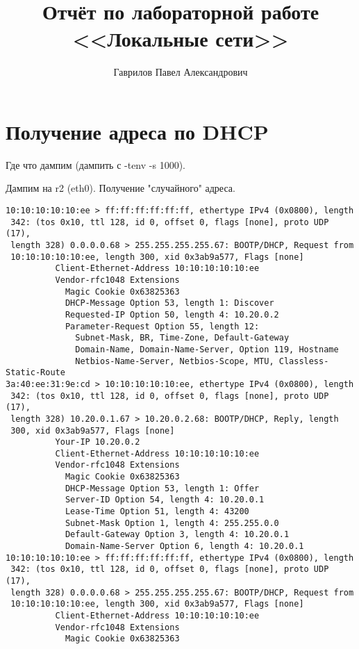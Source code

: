 \documentclass[a4paper,12pt]{article}
\title{Отчёт по лабораторной работе \\ <<Локальные сети>>}
\author{Гаврилов Павел Александрович}
\begin{document}
\maketitle

\tableofcontents

\section{Получение адреса по DHCP}

Где что дампим (дампить с -tenv -s 1000).

Дампим на r2 (eth0). Получение "случайного" адреса.

\begin{lstlisting}
10:10:10:10:10:ee > ff:ff:ff:ff:ff:ff, ethertype IPv4 (0x0800), length
 342: (tos 0x10, ttl 128, id 0, offset 0, flags [none], proto UDP (17),
 length 328) 0.0.0.0.68 > 255.255.255.255.67: BOOTP/DHCP, Request from
 10:10:10:10:10:ee, length 300, xid 0x3ab9a577, Flags [none]
          Client-Ethernet-Address 10:10:10:10:10:ee
          Vendor-rfc1048 Extensions
            Magic Cookie 0x63825363
            DHCP-Message Option 53, length 1: Discover
            Requested-IP Option 50, length 4: 10.20.0.2
            Parameter-Request Option 55, length 12: 
              Subnet-Mask, BR, Time-Zone, Default-Gateway
              Domain-Name, Domain-Name-Server, Option 119, Hostname
              Netbios-Name-Server, Netbios-Scope, MTU, Classless-Static-Route
3a:40:ee:31:9e:cd > 10:10:10:10:10:ee, ethertype IPv4 (0x0800), length
 342: (tos 0x10, ttl 128, id 0, offset 0, flags [none], proto UDP (17),
 length 328) 10.20.0.1.67 > 10.20.0.2.68: BOOTP/DHCP, Reply, length
 300, xid 0x3ab9a577, Flags [none]
          Your-IP 10.20.0.2
          Client-Ethernet-Address 10:10:10:10:10:ee
          Vendor-rfc1048 Extensions
            Magic Cookie 0x63825363
            DHCP-Message Option 53, length 1: Offer
            Server-ID Option 54, length 4: 10.20.0.1
            Lease-Time Option 51, length 4: 43200
            Subnet-Mask Option 1, length 4: 255.255.0.0
            Default-Gateway Option 3, length 4: 10.20.0.1
            Domain-Name-Server Option 6, length 4: 10.20.0.1
10:10:10:10:10:ee > ff:ff:ff:ff:ff:ff, ethertype IPv4 (0x0800), length
 342: (tos 0x10, ttl 128, id 0, offset 0, flags [none], proto UDP (17),
 length 328) 0.0.0.0.68 > 255.255.255.255.67: BOOTP/DHCP, Request from
 10:10:10:10:10:ee, length 300, xid 0x3ab9a577, Flags [none]
          Client-Ethernet-Address 10:10:10:10:10:ee
          Vendor-rfc1048 Extensions
            Magic Cookie 0x63825363

\end{lstlisting}
\end{document}
